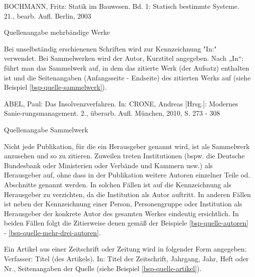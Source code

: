 \begin{example}[H]
    \begin{framed}
        BOCHMANN, Fritz: Statik im Bauwesen. Bd. 1: Statisch bestimmte Systeme. 21., bearb. Aufl. Berlin, 2003
    \end{framed}
    \caption{Quellenangabe mehrbändige Werke}
    \label{bsp-quelle-mehrbaendig}
\end{example}

Bei unselbständig erschienenen Schriften wird zur Kennzeichnung "In:" verwendet.
Bei Sammelwerken wird der Autor, Kurztitel angegeben. Nach „In“: führt man das Sammelwerk auf, in dem das zitierte Werk (der Aufsatz) enthalten ist und die Seitenangaben (Anfangsseite - Endseite) des zitierten Werks auf (siehe Beispiel \ref{bsp-quelle-sammelwerk}).

\begin{example}[H]
    \begin{framed}
        ABEL, Paul: Das Insolvenzverfahren. In: CRONE, Andreas [Hrsg.]: Modernes Sanie-rungsmanagement. 2., überarb. Aufl. München, 2010, S. 273 - 308
    \end{framed}
    \caption{Quellenangabe Sammelwerk}
    \label{bsp-quelle-sammelwerk}
\end{example}

Nicht jede Publikation, für die ein Herausgeber genannt wird, ist als Sammelwerk anzusehen und so zu zitieren.
Zuweilen treten Institutionen (bspw. die Deutsche Bundesbank oder Ministerien oder Verbände und Kammern usw.) als Herausgeber auf, ohne dass in der Publikation weitere Autoren einzelner Teile od. Abschnitte genannt werden.
In solchen Fällen ist auf die Kennzeichnung als Herausgeber zu verzichten, da die Institution als Autor auftritt.
In anderen Fällen ist neben der Kennzeichnung einer Person, Personengruppe oder Institution als Herausgeber der konkrete Autor des gesamten Werkes eindeutig ersichtlich.
In beiden Fällen folgt die Zitierweise denen  gemäß der Beispiele \ref{bsp-quelle-autoren} - \ref{bsp-quelle-mehr-drei-autoren}.

Ein Artikel aus einer Zeitschrift oder Zeitung wird in folgender Form angegeben:\\
Verfasser: Titel (des Artikels). In: Titel der Zeitschrift, Jahrgang, Jahr, Heft oder Nr., Seitenangaben der Quelle (siehe Beispiel \ref{bsp-quelle-artikel}).

